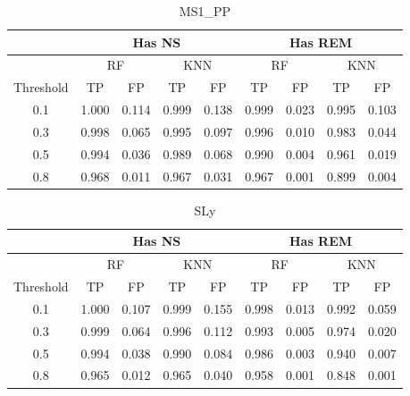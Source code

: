 \begin{table}[]
\centering
\begin{tabular}{@{}c|cccc|cccc@{}}
\toprule
\multicolumn{1}{l|}{}          & \multicolumn{4}{c|}{Has NS}                       & \multicolumn{4}{c}{Has REM}                      \\ \midrule
                               & \multicolumn{2}{c}{RF} & \multicolumn{2}{c|}{KNN} & \multicolumn{2}{c}{RF} & \multicolumn{2}{c}{KNN} \\
\multicolumn{1}{l|}{Threshold} & TP         & FP        & TP          & FP         & TP         & FP        & TP         & FP         \\ \midrule
0.1                            & 1.000      & 0.114     &    0.999         & 0.138           & 0.999      & 0.023     &    0.995        &  0.103         \\
0.3                            & 0.998      & 0.065     &   0.995          & 0.097            & 0.996      & 0.010     &  0.983          & 0.044           \\
0.5                            & 0.994      & 0.036     &  0.989           & 0.068           & 0.990      & 0.004     &   0.961         & 0.019           \\
0.8                            & 0.968      & 0.011     &    0.967         & 0.031            & 0.967      & 0.001     &   0.899         &   0.004         \\ \bottomrule
\end{tabular}
\caption{MS1\_PP}
\label{tab:TPms1}
\end{table}

\begin{table}[]
\centering
\begin{tabular}{@{}c|cccc|cccc@{}}
\toprule
\multicolumn{1}{l|}{}          & \multicolumn{4}{c|}{Has NS}                       & \multicolumn{4}{c}{Has REM}                      \\ \midrule
                               & \multicolumn{2}{c}{RF} & \multicolumn{2}{c|}{KNN} & \multicolumn{2}{c}{RF} & \multicolumn{2}{c}{KNN} \\
\multicolumn{1}{l|}{Threshold} & TP         & FP        & TP          & FP         & TP         & FP        & TP         & FP         \\ \midrule
0.1                            & 1.000      & 0.107     &   0.999          &           0.155 & 0.998      & 0.013     &  0.992          & 0.059           \\
0.3                            & 0.999      & 0.064     &  0.996           &           0.112 & 0.993      & 0.005     & 0.974           & 0.020           \\
0.5                            & 0.994      & 0.038     &  0.990           &           0.084 & 0.986      & 0.003     & 0.940           &   0.007         \\
0.8                            & 0.965      & 0.012     &   0.965          &           0.040 & 0.958      & 0.001     & 0.848           &  0.001          \\ \bottomrule
\end{tabular}
\caption{SLy}
\label{tab:TPsly}
\end{table}

